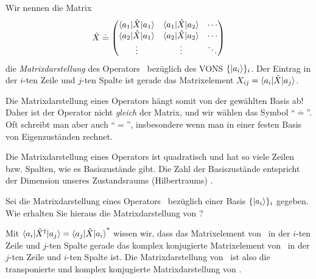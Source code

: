 \begin{defn}
 Wir nennen die Matrix
 \begin{equation}
  \opx \doteq \begin{pmatrix}
            \braket{a_1 | \opx | a_1} & \braket{a_1 | \opx | a_2} & \cdots \\
            \braket{a_2 | \opx | a_1} & \braket{a_2 | \opx | a_2} & \cdots \\
            \vdots & \vdots & \ddots
           \end{pmatrix}
 \end{equation}
 die \emph{Matrixdarstellung} des Operators \opx\ bez\"uglich des VONS $\{\ket{a_i}\}_i$. Der Eintrag in der $i$-ten Zeile und $j$-ten Spalte ist gerade das Matrixelement $X_{ij} = \braket{a_i | \opx | a_j}$.
\end{defn}
\begin{notiz}
 Die Matrixdarstellung eines Operators h\"angt somit von der gew\"ahlten Basis ab! Daher ist der Operator nicht \emph{gleich} der Matrix, und wir w\"ahlen das Symbol \enquote{$\doteq$}. Oft schreibt man aber auch \enquote{$=$}, insbesondere wenn man in einer festen Basis von Eigenzust\"anden rechnet.
\end{notiz}
\begin{eig}
 Die Matrixdarstellung eines Operators ist quadratisch und hat so viele Zeilen bzw. Spalten, wie es Basiszust\"ande gibt. Die Zahl der Basiszust\"ande entspricht der Dimension unseres Zustandsraums (Hilbertraums) \hs.
\end{eig}
\begin{aufg}
 Sei die Matrixdarstellung eines Operators \opx\ bez\"uglich einer Basis $\{\ket{a_i}\}_i$ gegeben. Wie erhalten Sie hieraus die Matrixdarstellung von \opxh?
\end{aufg}
\begin{loes}
 Mit $\braket{a_i | \opxh | a_j} = \cc{\braket{a_j | \opx | a_i}}$ wissen wir, dass das Matrixelement von \opxh\ in der $i$-ten Zeile und $j$-ten Spalte gerade das komplex konjugierte Matrixelement von \opx\ in der $j$-ten Zeile und $i$-ten Spalte ist. Die Matrixdarstellung von \opxh\ ist also die transponierte und komplex konjugierte Matrixdarstellung von \opx.
\end{loes}
